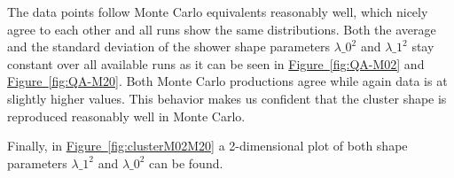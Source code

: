 The data points follow Monte Carlo equivalents reasonably well, which nicely agree to each other and all runs show the same distributions.
Both the average and the standard deviation of the shower shape parameters $\lambda\_{0}^{2}$ and $\lambda\_{1}^{2}$ stay constant over all available runs as it can be seen in \hyperref[fig:QA-M02]{Figure~\ref*{fig:QA-M02}} and \hyperref[fig:QA-M20]{Figure~\ref*{fig:QA-M20}}.
Both Monte Carlo productions agree while again data is at slightly higher values.
This behavior makes us confident that the cluster shape is reproduced reasonably well in Monte Carlo.

Finally, in \hyperref[fig:clusterM02M20]{Figure~\ref*{fig:clusterM02M20}} a 2-dimensional plot of both shape parameters $\lambda\_{1}^{2}$ and $\lambda\_{0}^{2}$ can be found.

%
%
%
